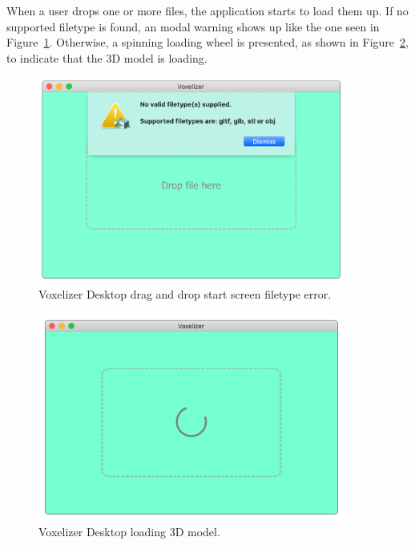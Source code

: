 When a user drops one or more files, the application starts to load them up. If no supported filetype is found, an modal warning shows up like the one seen in Figure~\ref{fig:voxelizer-desktop-gui-dnd-file-warning}. Otherwise, a spinning loading wheel is presented, as shown in Figure~\ref{fig:voxelizer-desktop-gui-loading}, to indicate that the 3D model is loading.

\begin{figure}[htp]
    \centering
    \includegraphics[width=0.9\textwidth]{sections/result/figures/voxelizer-desktop-gui-dnd-file-warning.png}
    \caption{Voxelizer Desktop drag and drop start screen filetype error.}
    \label{fig:voxelizer-desktop-gui-dnd-file-warning}
\end{figure}
\begin{figure}[htp]
    \centering
    \includegraphics[width=0.9\textwidth]{sections/result/figures/voxelizer-desktop-gui-loading.png}
    \caption{Voxelizer Desktop loading 3D model.}
    \label{fig:voxelizer-desktop-gui-loading}
\end{figure}
\clearpage

